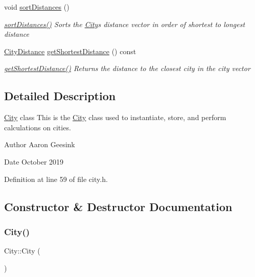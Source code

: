 \begin{DoxyCompactItemize}
void \mbox{\hyperlink{class_city_a9e3da459f9dcf61ae1a4551d79abafb8}{sort\+Distances}} ()
\begin{DoxyCompactList}\small\item\em \mbox{\hyperlink{class_city_a9e3da459f9dcf61ae1a4551d79abafb8}{sort\+Distances()}} Sorts the \mbox{\hyperlink{class_city}{City}}\textquotesingle{}s distance vector in order of shortest to longest distance \end{DoxyCompactList}\item 
\mbox{\hyperlink{struct_city_distance}{City\+Distance}} \mbox{\hyperlink{class_city_ad577ecd4be83b37ef2f9c5ff547f5259}{get\+Shortest\+Distance}} () const
\begin{DoxyCompactList}\small\item\em \mbox{\hyperlink{class_city_ad577ecd4be83b37ef2f9c5ff547f5259}{get\+Shortest\+Distance()}} Returns the distance to the closest city in the city vector \end{DoxyCompactList}\end{DoxyCompactItemize}


\subsection{Detailed Description}
\mbox{\hyperlink{class_city}{City}} class This is the \mbox{\hyperlink{class_city}{City}} class used to instantiate, store, and perform calculations on cities. 

\begin{DoxyAuthor}{Author}
Aaron Geesink 
\end{DoxyAuthor}
\begin{DoxyDate}{Date}
October 2019 
\end{DoxyDate}


Definition at line 59 of file city.\+h.



\subsection{Constructor \& Destructor Documentation}
\mbox{\label{class_city_a1b1f549430f0a7ecd0ec7b1605415193}} 
\subsubsection{\texorpdfstring{City()}{City()}\hspace{0.1cm}{\footnotesize\ttfamily [1/2]}}
{\footnotesize\ttfamily City\+::\+City (\begin{DoxyParamCaption}{ }\end{DoxyParamCaption})}




